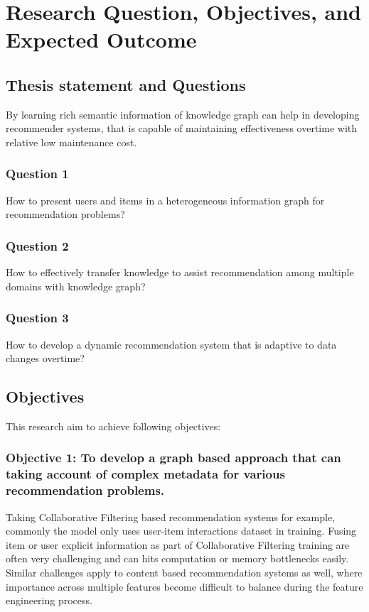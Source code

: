 \section{Research Question, Objectives, and Expected Outcome}

\subsection{Thesis statement and Questions}
By learning rich semantic information of knowledge graph can help in developing recommender systems, that is capable of maintaining effectiveness overtime with relative low maintenance cost. 

\subsubsection*{Question 1}
How to present users and items in a heterogeneous information graph for recommendation problems?

\subsubsection*{Question 2}
How to effectively transfer knowledge to assist recommendation among multiple domains with knowledge graph?

\subsubsection*{Question 3}
How to develop a dynamic recommendation system that is adaptive to data changes overtime?

\subsection{Objectives}
This research aim to achieve following objectives: 

\subsubsection*{Objective 1: To develop a graph based approach that can taking account of complex metadata for various recommendation problems.}

Taking Collaborative Filtering based recommendation systems for example, commonly the model only uses user-item interactions dataset in training. Fusing item or user explicit information as part of Collaborative Filtering training are often very challenging and can hits computation or memory bottlenecks easily. Similar challenges apply to content based recommendation systems as well, where importance across multiple features become difficult to balance during the feature engineering process.

